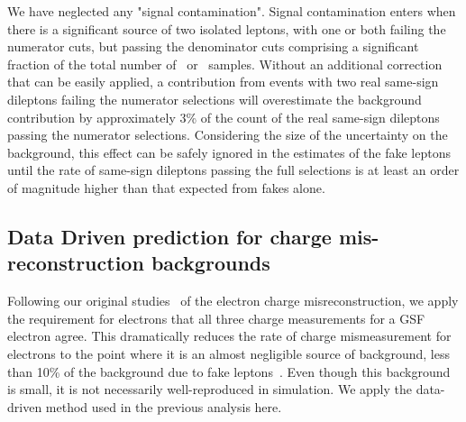 We have neglected any "signal contamination". 
Signal contamination enters when there is a significant
source of two isolated leptons, with one or both failing the numerator cuts, but passing the denominator cuts
comprising  a significant fraction of the total number of \nNoNu\ or \nNoNo\ samples. 
Without an additional correction that can be easily applied,
a contribution from events with two real same-sign dileptons failing the numerator selections
 will overestimate the background contribution by approximately 3\% of the count of
the real same-sign dileptons passing the numerator selections.
Considering the size of the uncertainty on the background,
this effect can be safely ignored in the estimates 
of the fake leptons until the rate of same-sign dileptons passing the full
selections is at least an order of magnitude  higher than that expected
from fakes alone.


\subsection{Data Driven prediction for charge mis-reconstruction backgrounds}
\label{sec:flips}


Following our original studies~\cite{sspaper2010} of the electron charge misreconstruction, 
we apply the requirement for electrons that all three charge measurements for a GSF electron agree. 
This dramatically reduces the rate of charge mismeasurement for electrons to the point where it 
is an almost negligible source of background, less than 10\% of the background due to fake leptons~\cite{sspaper2010,ssnote2011,sspaper2011}.
Even though this background is small, it is not necessarily well-reproduced in simulation.
We apply the data-driven method used in the previous analysis here.

